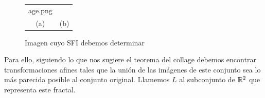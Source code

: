 \begin{ejemplo}
\begin{figure}[ht]
\begin{tabular}{cc}
age.png} \\ (a) & (b) \\
        \end{tabular}
        \caption{Imagen cuyo SFI debemos determinar}
        \label{fig:ejemplo-collage}
    \end{figure}

    Para ello, siguiendo lo que nos sugiere el teorema del collage debemos encontrar transformaciones afines tales que la unión de las imágenes de este conjunto sea lo más parecida posible al conjunto original. Llamemos $L$ al subconjunto de $\mathbb{R}^2$ que representa este fractal.


\end{ejemplo}
